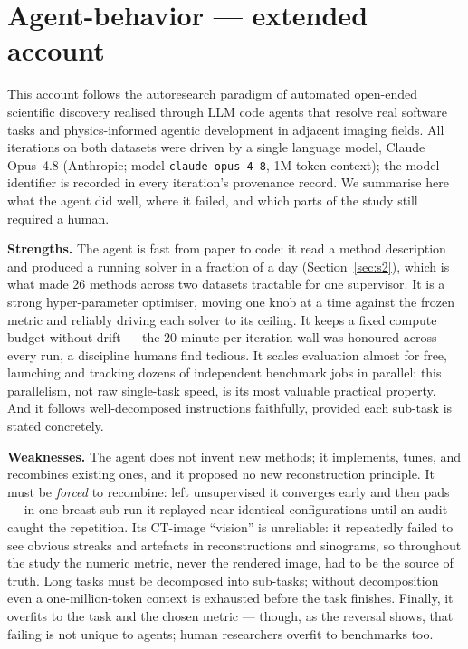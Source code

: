 \documentclass[AMA,twocolumn]{USG}
\begin{document}
\section{Agent-behavior --- extended account}\label{sec:s7}

This account follows the autoresearch paradigm of automated open-ended scientific discovery\cite{lu2024aiscientist} realised through LLM code agents that resolve real software tasks\cite{yang2024sweagent,jimenez2024swebench} and physics-informed agentic development in adjacent imaging fields.\cite{zaiss2026agent4mr} All iterations on both datasets were driven by a single language model, Claude Opus~4.8 (Anthropic; model \texttt{claude-opus-4-8}, 1M-token context); the model identifier is recorded in every iteration's provenance record. We summarise here what the agent did well, where it failed, and which parts of the study still required a human.

\textbf{Strengths.} The agent is fast from paper to code: it read a method description and produced a running solver in a fraction of a day (Section~\ref{sec:s2}), which is what made 26 methods across two datasets tractable for one supervisor. It is a strong hyper-parameter optimiser, moving one knob at a time against the frozen metric and reliably driving each solver to its ceiling. It keeps a fixed compute budget without drift --- the 20-minute per-iteration wall was honoured across every run, a discipline humans find tedious. It scales evaluation almost for free, launching and tracking dozens of independent benchmark jobs in parallel; this parallelism, not raw single-task speed, is its most valuable practical property. And it follows well-decomposed instructions faithfully, provided each sub-task is stated concretely.

\textbf{Weaknesses.} The agent does not invent new methods; it implements, tunes, and recombines existing ones, and it proposed no new reconstruction principle. It must be \emph{forced} to recombine: left unsupervised it converges early and then pads --- in one breast sub-run it replayed near-identical configurations until an audit caught the repetition. Its CT-image ``vision'' is unreliable: it repeatedly failed to see obvious streaks and artefacts in reconstructions and sinograms, so throughout the study the numeric metric, never the rendered image, had to be the source of truth. Long tasks must be decomposed into sub-tasks; without decomposition even a one-million-token context is exhausted before the task finishes. Finally, it overfits to the task and the chosen metric --- though, as the reversal shows, that failing is not unique to agents; human researchers overfit to benchmarks too.
\end{document}
